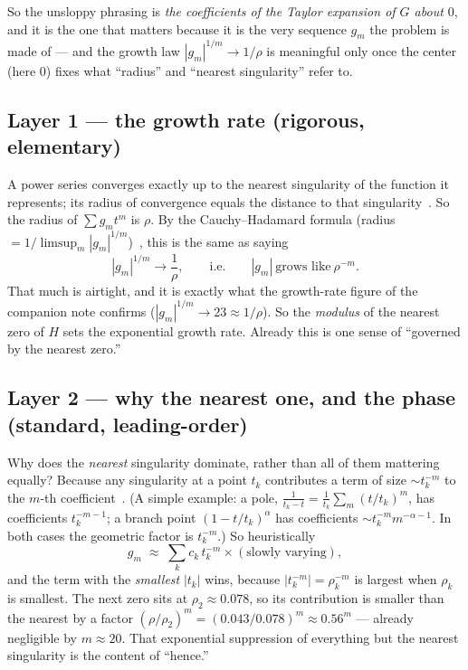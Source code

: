 \documentclass[11pt]{amsart}
\begin{document}
So the unsloppy phrasing is \emph{the coefficients of the Taylor expansion of $G$ about
$0$}, and it is the one that matters because it is the very sequence $g_m$ the problem is
made of --- and the growth law $|g_m|^{1/m}\to1/\rho$ is meaningful only once the center
(here $0$) fixes what ``radius'' and ``nearest singularity'' refer to.

\subsection*{Layer 1 --- the growth rate (rigorous, elementary)}
A power series converges exactly up to the nearest singularity of the function it
represents; its radius of convergence equals the distance to that
singularity~\cite{Ahlfors,Hadamard1892}. So the radius of $\sum g_m t^m$ is $\rho$. By the
Cauchy--Hadamard formula (radius $=1/\limsup_m|g_m|^{1/m}$)~\cite{Ahlfors}, this is the same
as saying
\[
|g_m|^{1/m}\longrightarrow \frac1\rho,\qquad\text{i.e.}\qquad |g_m|\ \text{grows like}\ \rho^{-m}.
\]
That much is airtight, and it is exactly what the growth-rate figure of the companion note
confirms ($|g_m|^{1/m}\to 23\approx1/\rho$). So the \emph{modulus} of the nearest zero of
$H$ sets the exponential growth rate. Already this is one sense of ``governed by the nearest
zero.''

\subsection*{Layer 2 --- why the nearest one, and the phase (standard, leading-order)}
Why does the \emph{nearest} singularity dominate, rather than all of them mattering equally?
Because any singularity at a point $t_k$ contributes a term of size $\sim t_k^{-m}$ to the
$m$-th coefficient~\cite{FlajoletOdlyzko1990,FlajoletSedgewick2009}. (A simple example: a
pole, $\frac{1}{t_k-t}=\frac{1}{t_k}\sum_m (t/t_k)^m$, has coefficients $t_k^{-m-1}$; a
branch point $(1-t/t_k)^{\alpha}$ has coefficients $\sim t_k^{-m}m^{-\alpha-1}$. In both
cases the geometric factor is $t_k^{-m}$.) So heuristically
\[
g_m\;\approx\;\sum_k c_k\, t_k^{-m}\times(\text{slowly varying}),
\]
and the term with the \emph{smallest} $|t_k|$ wins, because $|t_k^{-m}|=\rho_k^{-m}$ is
largest when $\rho_k$ is smallest. The next zero sits at $\rho_2\approx0.078$, so its
contribution is smaller than the nearest by a factor
$(\rho/\rho_2)^m=(0.043/0.078)^m\approx 0.56^m$ --- already negligible by $m\approx20$. That
exponential suppression of everything but the nearest singularity is the content of
``hence.''
\end{document}
